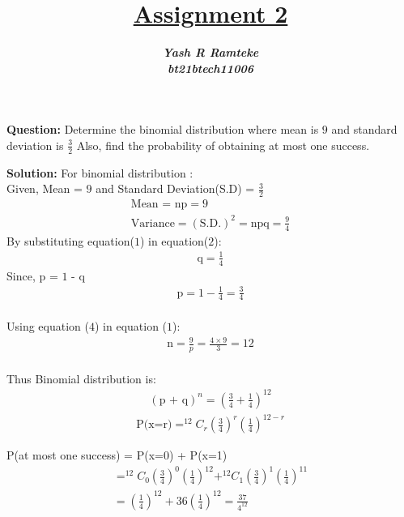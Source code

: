 \documentclass[journal,12pt,twocolumn]{IEEEtran}
\title{\textbf{\underline{Assignment 2}}}
\author{\textbf{\textit{Yash R Ramteke}}\\
\textbf{\textit{bt21btech11006}}}
\begin{document}
\maketitle

\textbf{Question:}
Determine the binomial distribution where mean is $9$ and standard deviation is $\frac{3}{2}$ Also, find the probability of obtaining at most one success.

\bigskip
\textbf{Solution:}
For binomial distribution :\\
Given, Mean = $9$ and Standard Deviation(S.D) = $\frac{3}{2}$
\begin{align}
    \text{Mean = np} = 9
    \\
    \text{Variance} = (\text{S.D.})^{2} = \text{npq} = \frac{9}{4}
\end{align}
By substituting equation($1$) in equation($2$):
\begin{align}
      \text{q} = \frac{1}{4}
\end{align}
Since, p = $1$ - q
\begin{align}
      \text{p} = 1 - \frac{1}{4} = \frac{3}{4} 
\end{align}\\
Using equation ($4$) in equation ($1$):
\begin{align}
      \text{n} = \frac{9}{p} = \frac{4\times9}{3} = 12
\end{align}\\
Thus Binomial distribution is:
\begin{align}
   \left(\text{p + q}\right)^n =  \left(\frac{3}{4} + \frac{1}{4}\right)^{12}
\end{align}
{}
\begin{align}
\text{P(x=r)} = ^{12}C_r \left(\frac{3}{4}\right)^r \left(\frac{1}{4}\right)^{12-r}
\end{align}

\begin{center}
\end{center}
P(at most one success) = P(x=0) + P(x=1)
\begin{align}
= ^{12}C_0 \left({\frac{3}{4}}\right)^0 \left(\frac{1}{4}\right)^{12} + ^{12}C_1 \left(\frac{3}{4}\right)^1 \left(\frac{1}{4}\right)^{11} 
\\
= \left(\frac{1}{4}\right)^{12} + 36\left(\frac{1}{4}\right)^{12} =  \frac{37}{4^{12}}
\end{align}
\end{document}
